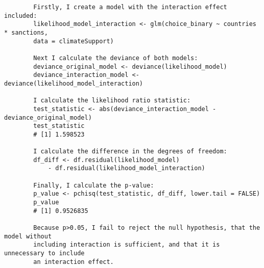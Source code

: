 \documentclass[12pt,letterpaper]{article}
\begin{document}
\begin{enumerate}
\begin{enumerate}
\begin{verbatim}
		Firstly, I create a model with the interaction effect included:
		likelihood_model_interaction <- glm(choice_binary ~ countries * sanctions,
		data = climateSupport)
		
		Next I calculate the deviance of both models:
		deviance_original_model <- deviance(likelihood_model)
		deviance_interaction_model <- deviance(likelihood_model_interaction)
		
		I calculate the likelihood ratio statistic:
		test_statistic <- abs(deviance_interaction_model - deviance_original_model)
		test_statistic
		# [1] 1.598523
		
		I calculate the difference in the degrees of freedom:
		df_diff <- df.residual(likelihood_model)
			- df.residual(likelihood_model_interaction)
		
		Finally, I calculate the p-value:
		p_value <- pchisq(test_statistic, df_diff, lower.tail = FALSE)
		p_value
		# [1] 0.9526835
		
		Because p>0.05, I fail to reject the null hypothesis, that the model without
		including interaction is sufficient, and that it is unnecessary to include
		an interaction effect.
		
	\end{verbatim}		
	
	\end{enumerate}
	\end{enumerate}
\end{document}
